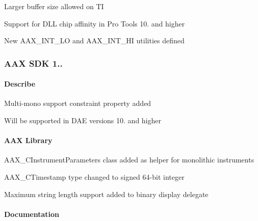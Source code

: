 \begin{DoxyItemize}
\item Larger buffer size allowed on T\+I 
\item Support for D\+L\+L chip affinity in Pro Tools 10. and higher 
\item New A\+A\+X\+\_\+\+I\+N\+T\+\_\+\+L\+O and A\+A\+X\+\_\+\+I\+N\+T\+\_\+\+H\+I utilities defined 
\end{DoxyItemize}\hypertarget{a00375_aax_sdk_1p0p4}{}\subsubsection{A\+A\+X S\+D\+K 1..}\label{a00375_aax_sdk_1p0p4}
\hypertarget{a00375_aax_sdk_1p0p4_Describe}{}\paragraph{Describe}\label{a00375_aax_sdk_1p0p4_Describe}

\begin{DoxyItemize}
\item Multi-\/mono support constraint property added 
\begin{DoxyItemize}
\item Will be supported in D\+A\+E versions 10. and higher 
\end{DoxyItemize}
\end{DoxyItemize}\hypertarget{a00375_aax_sdk_1p0p4_AAXLibrary}{}\paragraph{A\+A\+X Library}\label{a00375_aax_sdk_1p0p4_AAXLibrary}

\begin{DoxyItemize}
\item A\+A\+X\+\_\+\+C\+Instrument\+Parameters class added as helper for monolithic instruments 
\item A\+A\+X\+\_\+\+C\+Timestamp type changed to signed 64-\/bit integer 
\item Maximum string length support added to binary display delegate 
\end{DoxyItemize}\hypertarget{a00375_aax_sdk_1p0p4_Documentation}{}\paragraph{Documentation}\label{a00375_aax_sdk_1p0p4_Documentation}

